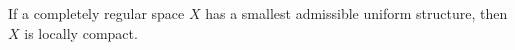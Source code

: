 If a completely regular space $X$ has a smallest admissible uniform structure, then $X$ is locally compact.
